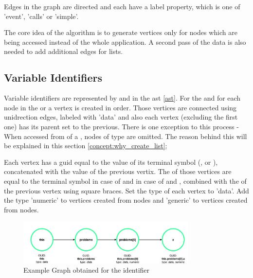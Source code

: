 Edges in the graph are directed and each have a label property, which is one of 'event', 'calls' or 'simple'. 

The core idea of the algorithm is to generate vertices only for nodes which are being accessed instead of the whole application. A second pass of the data is also needed to add additional edges for lists. 

\subsection{Variable Identifiers}
\label{concept:variable_identifiers}
Variable identifiers are represented by  and  in the \gls{ast} \ref{ast}. For the  and for each  node in the  or  a vertex is created in order. 
Those vertices are connected using unidrection edges, labeled with 'data' and also each vertex (excluding the first one) has its parent set to the previous. There is one exception to this process - When accessed from  of a , nodes of type  are omitted. The reason behind this will be explained in this section \ref{concept:why_create_list};


Each vertex has a \gls{guid} equal to the value of its terminal symbol (,  or ), concatenated with the value of the previous vertix.
The  of those vertices are equal to the terminal symbol in case of  and in case of  and , combined with the  of the previous vertex using square braces. Set the type of each vertex to 'data'. Add the type 'numeric' to vertices created from  nodes and 'generic' to vertices created from  nodes. 

\begin{figure}[H]
    \includegraphics[width=0.8\textwidth]{images/graph_simple.png}
     \caption{Example Graph obtained for the identifier  }
     \label{fig:graph_simple}
\end{figure}

